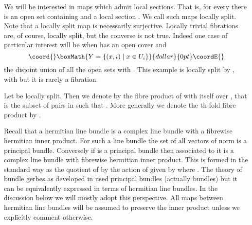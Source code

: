 \documentclass[a4paper,reqno]{amsart}
\theoremstyle{plain}
\theoremstyle{definition}
\theoremstyle{remark}
\numberwithin{equation}{section}
\numberwithin{figure}{section}
\providecommand{\CC}{{\mathbb C}}
\providecommand{\<}{\langle}
\renewcommand{\>}{\rangle}
\begin{document}
We will be interested in maps  \coordHE{} which admit local
sections.  That is, for every \coordHE{} there is an open set \coordHE{}
containing \coordHE{} and  a local section \coordHE{}.
          We call such maps locally split.   Note that a locally split map is
necessarily
surjective.  
Locally trivial fibrations are, of course, locally split, but the
converse is not true. Indeed one case of particular
interest will be when \coordHE{} has an open cover \coordHE{} and
$$\coord{}\boxMath{
Y = \{ (x, i) \mid x \in U_i \}
}{dollar}{0pt}\coordE{}$$
the
disjoint union of all the open sets \coordHE{} with \coordHE{}.
          This example is locally split by \coordHE{}, with
\coordHE{} but it is rarely a fibration.


Let \coordHE{} be locally split. Then we denote by
          \coordHE{} the fibre product
of \coordHE{} with itself over \myHighlight{$\pi$}\coordHE{},
          that is the subset of pairs \coordHE{} in
\coordHE{} such that \coordHE{}.  More generally we denote
the \coordHE{}th fold fibre product by \coordHE{}.

Recall that a hermitian line bundle  \coordHE{} is a complex line
bundle with a fibrewise
hermitian inner product. For such a line bundle the set of all
vectors of norm \coordHE{} is
a principal \coordHE{} bundle. Conversely if \coordHE{} is a principal
\coordHE{} bundle then associated to it is a complex
line bundle with fibrewise hermitian inner product.  This is
formed in the standard way as the quotient of \myHighlight{$P \times \CC$}\coordHE{} by the
action of \coordHE{} given by \coordHE{} where \coordHE{}.
       The theory of
bundle gerbes as developed in \cite{Mur} used principal bundles
(actually \myHighlight{$\CC^\times$}\coordHE{} bundles) but it can be equivalently
expressed in terms of hermitian line bundles. In the
discussion below we will mostly adopt this perspective.
All maps between hermitian line bundles will be assumed
to preserve the inner product unless we explicitly comment otherwise.
\end{document}
